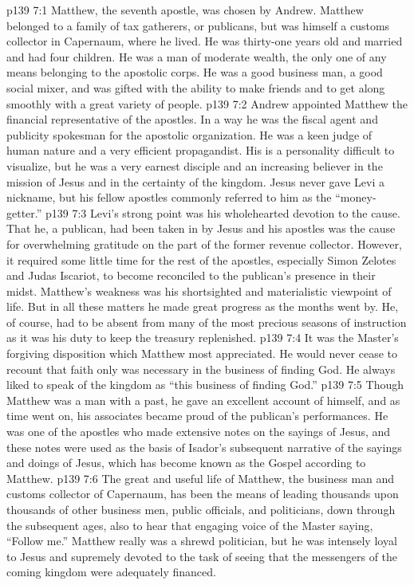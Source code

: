 \vs p139 7:1 Matthew, the seventh apostle, was chosen by Andrew. Matthew belonged to a family of tax gatherers, or publicans, but was himself a customs collector in Capernaum, where he lived. He was thirty\hyp{}one years old and married and had four children. He was a man of moderate wealth, the only one of any means belonging to the apostolic corps. He was a good business man, a good social mixer, and was gifted with the ability to make friends and to get along smoothly with a great variety of people.
\pc \vs p139 7:2 Andrew appointed Matthew the financial representative of the apostles. In a way he was the fiscal agent and publicity spokesman for the apostolic organization. He was a keen judge of human nature and a very efficient propagandist. His is a personality difficult to visualize, but he was a very earnest disciple and an increasing believer in the mission of Jesus and in the certainty of the kingdom. Jesus never gave Levi a nickname, but his fellow apostles commonly referred to him as the “money\hyp{}getter.”
\vs p139 7:3 Levi’s strong point was his wholehearted devotion to the cause. That he, a publican, had been taken in by Jesus and his apostles was the cause for overwhelming gratitude on the part of the former revenue collector. However, it required some little time for the rest of the apostles, especially Simon Zelotes and Judas Iscariot, to become reconciled to the publican’s presence in their midst. Matthew’s weakness was his shortsighted and materialistic viewpoint of life. But in all these matters he made great progress as the months went by. He, of course, had to be absent from many of the most precious seasons of instruction as it was his duty to keep the treasury replenished.
\vs p139 7:4 It was the Master’s forgiving disposition which Matthew most appreciated. He would never cease to recount that faith only was necessary in the business of finding God. He always liked to speak of the kingdom as “this business of finding God.”
\pc \vs p139 7:5 Though Matthew was a man with a past, he gave an excellent account of himself, and as time went on, his associates became proud of the publican’s performances. He was one of the apostles who made extensive notes on the sayings of Jesus, and these notes were used as the basis of Isador’s subsequent narrative of the sayings and doings of Jesus, which has become known as the Gospel according to Matthew.
\vs p139 7:6 The great and useful life of Matthew, the business man and customs collector of Capernaum, has been the means of leading thousands upon thousands of other business men, public officials, and politicians, down through the subsequent ages, also to hear that engaging voice of the Master saying, “Follow me.” Matthew really was a shrewd politician, but he was intensely loyal to Jesus and supremely devoted to the task of seeing that the messengers of the coming kingdom were adequately financed.
